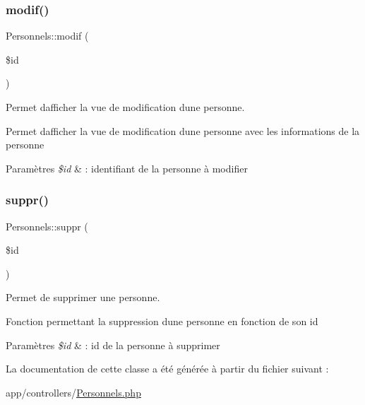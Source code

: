 \subsubsection{\texorpdfstring{modif()}{modif()}}
{\footnotesize\ttfamily Personnels\+::modif (\begin{DoxyParamCaption}\item[{}]{\$id }\end{DoxyParamCaption})}



Permet d\textquotesingle{}afficher la vue de modification d\textquotesingle{}une personne. 

Permet d\textquotesingle{}afficher la vue de modification d\textquotesingle{}une personne avec les informations de la personne 
\begin{DoxyParams}{Paramètres}
{\em \$id} & \+: identifiant de la personne à modifier \\
\hline
\end{DoxyParams}
\mbox{\label{class_personnels_a86deb89c14bbe050b7adb09ac6f0dad2}} 
\subsubsection{\texorpdfstring{suppr()}{suppr()}}
{\footnotesize\ttfamily Personnels\+::suppr (\begin{DoxyParamCaption}\item[{}]{\$id }\end{DoxyParamCaption})}



Permet de supprimer une personne. 

Fonction permettant la suppression d\textquotesingle{}une personne en fonction de son id 
\begin{DoxyParams}{Paramètres}
{\em \$id} & \+: id de la personne à supprimer \\
\hline
\end{DoxyParams}


La documentation de cette classe a été générée à partir du fichier suivant \+:\begin{DoxyCompactItemize}
\item 
app/controllers/\hyperlink{_personnels_8php}{Personnels.\+php}\end{DoxyCompactItemize}
